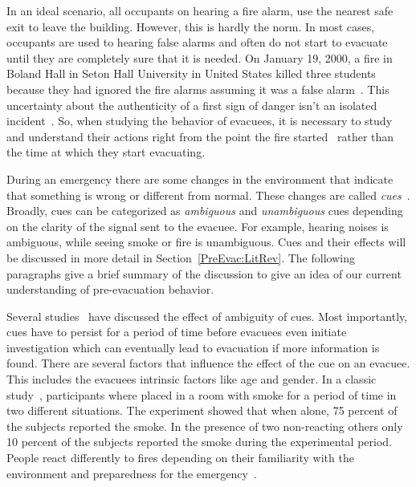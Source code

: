In an ideal scenario, all occupants on hearing a fire alarm, use the nearest safe exit to leave the building. However, this is hardly the norm. In most cases, occupants are used to hearing false alarms and often do not start to evacuate until they are completely sure that it is needed. On January 19, 2000, a fire in Boland Hall in Seton Hall University in United States killed three students because they had ignored the fire alarms assuming it was a false alarm~\cite{Berry:2000us}. This uncertainty about the authenticity of a first sign of danger isn't an isolated incident~\cite{Graham:2000vl,Proulx:2001we,Proulx:1995wq,Proulx:2003tc,Purser:2001ts,Ramachandran:1990wj,Sime:1995uu,Tong:1985wn}. So, when studying the behavior of evacuees, it is necessary to study and understand their actions right from the point the fire started~\cite{Tong:1985wn} rather than the time at which they start evacuating.


During an emergency there are some changes in the environment that indicate that something is wrong or different from normal. These changes are called \emph{cues}~\cite{Sime:1983uy}. Broadly, cues can be categorized as \emph{ambiguous} and \emph{unambiguous} cues depending on the clarity of the signal sent to the evacuee. For example, hearing noises is ambiguous, while seeing smoke or fire is unambiguous. Cues and their effects will be discussed in more detail in Section~\ref{PreEvac:LitRev}. The following paragraphs give a brief summary of the discussion to give an idea of our current understanding of pre-evacuation behavior.

Several studies~\cite{Ramachandran:1990wj,Proulx:2007ul,Tong:1985wn} have discussed the effect of ambiguity of cues. Most importantly, cues have to persist for a period of time before evacuees even initiate investigation which can eventually lead to evacuation if more information is found. There are several factors that influence the effect of the cue on an evacuee. This includes the evacuees intrinsic factors like age and gender. In a classic study~\cite{Latane:1969wm}, participants where placed in a room with smoke for a period of time in two different situations. The experiment showed that when alone, 75 percent of the subjects reported the smoke. In the presence of two non-reacting others only 10 percent of the subjects reported the smoke during the experimental period. People react differently to fires depending on their familiarity with the environment and preparedness for the emergency~\cite{Proulx:2003tc,Proulx:2001we,Paulsen:1984ti,Sandberg:1997tw,Cocking:2008vv,Tong:1985wn}.


